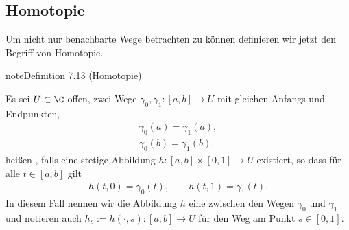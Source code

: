 \documentclass[letterpaper,10pt,german]{jupyterBook}
\begin{document}
\subsection{Homotopie}
\label{\detokenize{complexanalysis/cauchyintegral:homotopie}}
\sphinxAtStartPar
Um nicht nur benachbarte Wege betrachten zu können definieren wir jetzt den Begriff von Homotopie.
\label{complexanalysis/cauchyintegral:definition-3}
\begin{sphinxadmonition}{note}{Definition 7.13 (Homotopie)}



\sphinxAtStartPar
Es sei \(U\subset\C\) offen, zwei Wege \(\gamma_0, \gamma_1:[a,b]\to U\) mit gleichen Anfangs und Endpunkten,
\begin{equation*}
\begin{split}\gamma_0(a) = \gamma_1(a),\\
\gamma_0(b) = \gamma_1(b),\end{split}
\end{equation*}
\sphinxAtStartPar
heißen , falls eine stetige Abbildung \(h:[a,b]\times[0,1]\to U\) existiert, so dass für alle \(t\in[a,b]\) gilt
\begin{equation*}
\begin{split}h(t,0) = \gamma_0(t), \qquad h(t,1) = \gamma_1(t).\end{split}
\end{equation*}
\sphinxAtStartPar
In diesem Fall nennen wir die Abbildung \(h\) eine  zwischen den Wegen \(\gamma_0\) und \(\gamma_1\) und notieren auch \(h_s:=h(\cdot,s):[a,b]\to U\) für den Weg am Punkt \(s\in [0,1]\).
\end{sphinxadmonition}
\end{document}
